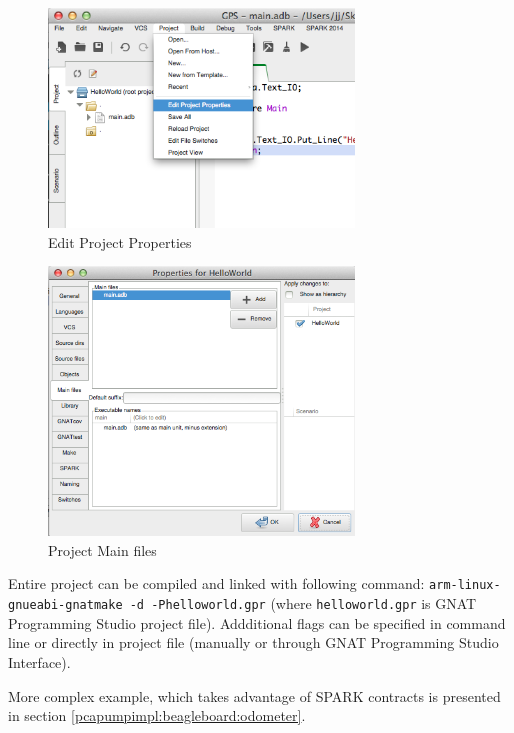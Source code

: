 \begin{figure}[ht]%
    \begin{center}
    	\includegraphics[width=3.2in]{figures/EditProjectProperties.png}
    	\caption{Edit Project Properties}
    \end{center}
    \label{figure:editprojectproperties}
\end{figure}

\begin{figure}[ht]%
    \begin{center}
    	\includegraphics[width=3.2in]{figures/Properties-MainFiles.png}
    	\caption{Project Main files}
    \end{center}
    \label{figure:mainfiles}
\end{figure}

Entire project can be compiled and linked with following command: \lstinline{arm-linux-gnueabi-gnatmake -d -Phelloworld.gpr} (where \lstinline{helloworld.gpr} is GNAT Programming Studio project file). Addditional flags can be specified in command line or directly in project file (manually or through GNAT Programming Studio Interface).

More complex example, which takes advantage of SPARK contracts is presented in section \ref{pcapumpimpl:beagleboard:odometer}.


